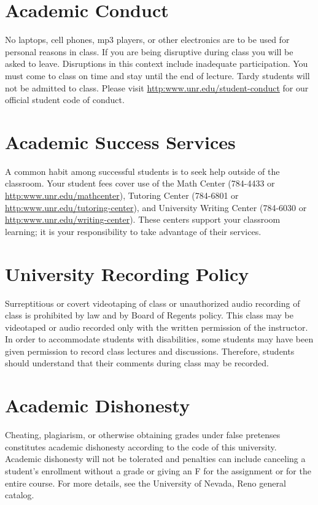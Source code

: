 \documentclass[11pt,onecolumn]{article}
\begin{document}
\section*{Academic Conduct}
No laptops, cell phones, mp3 players, or other electronics are to be used for personal reasons in class. If you are being disruptive during class you will be asked to leave. Disruptions in this context include inadequate participation. You must come to class on time and stay until the end of lecture. Tardy students will not be admitted to class. Please visit \url{http:www.unr.edu/student-conduct} for our official student code of conduct.

\section*{Academic Success Services}
A common habit among successful students is to seek help outside of the classroom. Your student fees cover use of the Math Center (784-4433 or \url{http:www.unr.edu/mathcenter}), Tutoring Center (784-6801 or \url{http:www.unr.edu/tutoring-center}), and University Writing Center (784-6030 or \url{http:www.unr.edu/writing-center}). These centers support your classroom learning; it is your responsibility to take advantage of their services.

\section*{University Recording Policy}
Surreptitious or covert videotaping of class or unauthorized audio recording of class is prohibited by law and by Board of Regents policy. This class may be videotaped or audio recorded only with the written permission of the instructor. In order to accommodate students with disabilities, some students may have been given permission to record class lectures and discussions. Therefore, students should understand that their comments during class may be recorded.

\section*{Academic Dishonesty}
Cheating, plagiarism, or otherwise obtaining grades under false pretenses constitutes academic dishonesty according to the code of this university. Academic dishonesty will not be tolerated and penalties can include canceling a student’s enrollment without a grade or giving an F for the assignment or for the entire course. For more details, see the University of Nevada, Reno general catalog.
\end{document}
